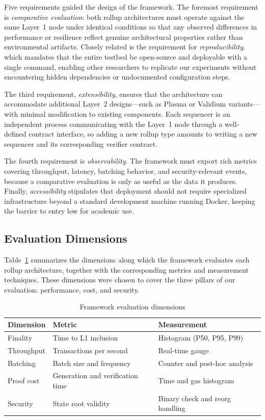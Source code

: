 \documentclass[
]{elteikthesis}[2024/04/26]
\begin{document}
Five requirements guided the design of the framework. The foremost requirement is \textit{comparative evaluation}: both rollup architectures must operate against the same Layer~1 node under identical conditions so that any observed differences in performance or resilience reflect genuine architectural properties rather than environmental artifacts. Closely related is the requirement for \textit{reproducibility}, which mandates that the entire testbed be open-source and deployable with a single command, enabling other researchers to replicate our experiments without encountering hidden dependencies or undocumented configuration steps.

The third requirement, \textit{extensibility}, ensures that the architecture can accommodate additional Layer~2 designs---such as Plasma or Validium variants---with minimal modification to existing components. Each sequencer is an independent process communicating with the Layer~1 node through a well-defined contract interface, so adding a new rollup type amounts to writing a new sequencer and its corresponding verifier contract.

The fourth requirement is \textit{observability}. The framework must export rich metrics covering throughput, latency, batching behavior, and security-relevant events, because a comparative evaluation is only as useful as the data it produces. Finally, \textit{accessibility} stipulates that deployment should not require specialized infrastructure beyond a standard development machine running Docker, keeping the barrier to entry low for academic use.

\subsection{Evaluation Dimensions}

Table~\ref{tab:eval-dimensions} summarizes the dimensions along which the framework evaluates each rollup architecture, together with the corresponding metrics and measurement techniques. These dimensions were chosen to cover the three pillars of our evaluation: performance, cost, and security.

\begin{table}[h]
    \centering
    \begin{tabular}{l|l|l}
        \hline
        \textbf{Dimension} & \textbf{Metric} & \textbf{Measurement} \\
        \hline
        Finality & Time to L1 inclusion & Histogram (P50, P95, P99) \\
        \hline
        Throughput & Transactions per second & Real-time gauge \\
        \hline
        Batching & Batch size and frequency & Counter and post-hoc analysis \\
        \hline
        Proof cost & Generation and verification time & Time and gas histogram \\
        \hline
        Security & State root validity & Binary check and reorg handling \\
        \hline
    \end{tabular}
    \caption{Framework evaluation dimensions}
    \label{tab:eval-dimensions}
\end{table}
\end{document}
